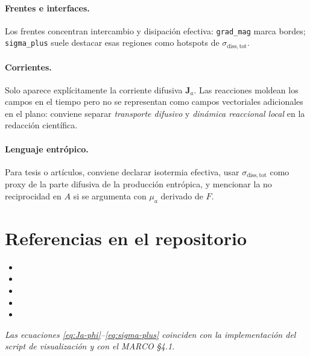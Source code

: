 \documentclass[11pt,a4paper]{article}
\newcommand{\vect}[1]{\mathbf{#1}}
\begin{document}
\paragraph{Frentes e interfaces.}
Los frentes concentran intercambio y disipación efectiva: \texttt{grad\_mag}
marca bordes; \texttt{sigma\_plus} suele destacar esas regiones como hotspots de
$\sigma_{\mathrm{diss,tot}}$.

\paragraph{Corrientes.}
Solo aparece explícitamente la corriente difusiva $\vect{J}_a$. Las reacciones
moldean los campos en el tiempo pero no se representan como campos vectoriales
adicionales en el plano: conviene separar \emph{transporte difusivo} y
\emph{dinámica reaccional local} en la redacción científica.

\paragraph{Lenguaje entrópico.}
Para tesis o artículos, conviene declarar isotermia efectiva, usar
$\sigma_{\mathrm{diss,tot}}$ como proxy de la parte difusiva de la producción
entrópica, y mencionar la no reciprocidad en $A$ si se argumenta con $\mu_a$
derivado de $F$.

\section{Referencias en el repositorio}

\begin{itemize}
  \item {}
  \item {}
  \item {}
  \item {}
  \item {}
\end{itemize}

\vspace{1em}
\noindent\textit{Las ecuaciones \eqref{eq:Ja-phi}--\eqref{eq:sigma-plus} coinciden con la implementación del script de visualización y con el MARCO \S4.1.}
\end{document}
